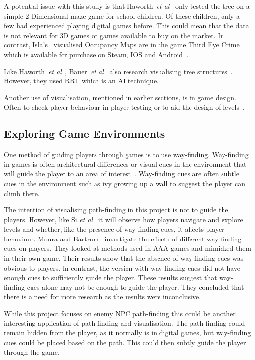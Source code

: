 \documentclass[journal]{IEEEtran}
\begin{document}
	A potential issue with this study is that Haworth~\textit{et al}~\cite{Haworth2010} only tested the tree on a simple 2-Dimensional maze game for school children. Of these children, only a few had experienced playing digital games before.  This could mean that the data is not relevant for 3D games or games available to buy on the market.  In contrast, Isla's~\cite{Isla2014} visualised Occupancy Maps are in the game Third Eye Crime which is available for purchase on Steam, IOS and Android~\cite{Isla2014, game:ThirdEyeCrime}.
	
	Like Haworth~\textit{et al}~\cite{Haworth2010}, Bauer~\textit{et al}~\cite{bauer2012} also research visualising tree structures~\cite{bauer2012}. However, they used RRT which is an AI technique.
	
	Another use of visualisation, mentioned in earlier sections, is in game design. Often to check player behaviour in player testing or to aid the design of levels~\cite{Nelson2011,bauer2012, Tremblay2013, Tremblay2014}. 
	
	\subsection{Exploring Game Environments} \label{Exploring}
	One method of guiding players through games is to use way-finding. Way-finding in games is often architectural differences or visual cues in the environment that will guide the player to an area of interest~\cite{si2017, Bacim2008}. Way-finding cues are often subtle cues in the environment such as ivy growing up a wall to suggest the player can climb there.
	
	The intention of visualising path-finding in this project is not to guide the players. However, like Si \textit{et al}~\cite{si2017} it will observe how players navigate and explore levels and whether, like the presence of way-finding cues, it affects player behaviour. 
	Moura and Bartram~\cite{moura2014} investigate the effects of different way-finding cues on players. They looked at methods used in AAA games and mimicked them in their own game. Their results show that the absence of way-finding cues was obvious to players. In contrast, the version with way-finding cues did not have enough cues to sufficiently guide the player. These results suggest that way-finding cues alone may not be enough to guide the player. They concluded that there is a need for more research as the results were inconclusive. 
	
	While this project focuses on enemy NPC path-finding this could be another interesting application of path-finding and visualisation. The path-finding could remain hidden from the player, as it normally is in digital games, but way-finding cues could be placed based on the path. This could then subtly guide the player through the game.
	
\end{document}

